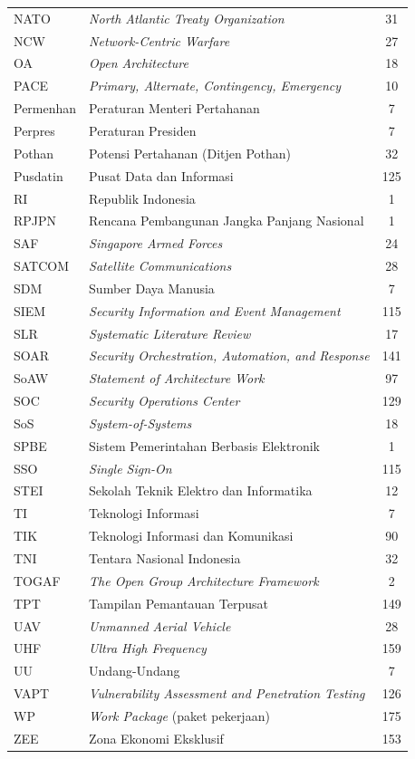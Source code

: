 \begin{longtable}{@{} l >{\raggedright\arraybackslash}p{7.5cm} c @{}}
NATO & \textit{North Atlantic Treaty Organization} & 31 \\
NCW & \textit{Network-Centric Warfare} & 27 \\
OA & \textit{Open Architecture} & 18 \\
PACE & \textit{Primary, Alternate, Contingency, Emergency} & 10 \\
Permenhan & Peraturan Menteri Pertahanan & 7 \\
Perpres & Peraturan Presiden & 7 \\
Pothan & Potensi Pertahanan (Ditjen Pothan) & 32 \\
Pusdatin & Pusat Data dan Informasi & 125 \\
RI & Republik Indonesia & 1 \\
RPJPN & Rencana Pembangunan Jangka Panjang Nasional & 1 \\
SAF & \textit{Singapore Armed Forces} & 24 \\
SATCOM & \textit{Satellite Communications} & 28 \\
SDM & Sumber Daya Manusia & 7 \\
SIEM & \textit{Security Information and Event Management} & 115 \\
SLR & \textit{Systematic Literature Review} & 17 \\
SOAR & \textit{Security Orchestration, Automation, and Response} & 141 \\
SoAW & \textit{Statement of Architecture Work} & 97 \\
SOC & \textit{Security Operations Center} & 129 \\
SoS & \textit{System-of-Systems} & 18 \\
SPBE & Sistem Pemerintahan Berbasis Elektronik & 1 \\
SSO & \textit{Single Sign-On} & 115 \\
STEI & Sekolah Teknik Elektro dan Informatika & 12 \\
TI & Teknologi Informasi & 7 \\
TIK & Teknologi Informasi dan Komunikasi & 90 \\
TNI & Tentara Nasional Indonesia & 32 \\
TOGAF & \textit{The Open Group Architecture Framework} & 2 \\
TPT & Tampilan Pemantauan Terpusat & 149 \\
UAV & \textit{Unmanned Aerial Vehicle} & 28 \\
UHF & \textit{Ultra High Frequency} & 159 \\
UU & Undang-Undang & 7 \\
VAPT & \textit{Vulnerability Assessment and Penetration Testing} & 126 \\
WP & \textit{Work Package} (paket pekerjaan) & 175 \\
ZEE & Zona Ekonomi Eksklusif & 153 \\


\end{longtable}